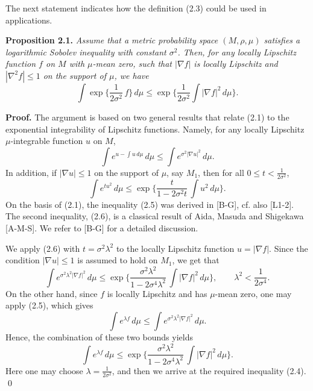 \documentclass[reqno,12pt]{amsart}
\theoremstyle{plain}
\begin{document}
The next statement indicates how the definition (2.3) could be used 
in applications.

\vskip5mm
{\bf Proposition 2.1.} {\it Assume that a metric probability space 
$(M,\rho,\mu)$ satisfies a logarithmic Sobolev inequality with constant 
$\sigma^2$. Then, for any locally Lipschitz function $f$ on $M$ with 
$\mu$-mean zero, such that $|\nabla f|$ is locally Lipschitz and
$|\nabla^2 f| \leq 1$ on the support of $\mu$, we have
\begin{equation}
\int \exp\Big\{\frac{1}{2\sigma^2}\, f\Big\}\,d\mu \leq \exp
\Big\{\frac{1}{2\sigma^2} \int |\nabla f|^2\,d\mu\Big\}.
\end{equation}
}

\vskip5mm
{\bf Proof.} The argument is based on two general results that relate 
(2.1) to the exponential integrability of Lipschitz functions.
Namely, for any locally Lipschitz $\mu$-integrable function $u$ on $M$,
\begin{equation}
\int e^{u - \int u\,d\mu}\,d\mu \leq \int e^{\sigma^2 |\nabla u|^2}\,d\mu.
\end{equation}
In addition, if $|\nabla u| \leq 1$ on the support of $\mu$, say $M_1$, 
then for all $0 \leq t < \frac{1}{2\sigma^2}$,
\begin{equation}
\int e^{tu^2}\,d\mu \leq \exp
\Big\{\frac{t}{1 - 2\sigma^2 t}\, \int u^2\,d\mu\Big\}.
\end{equation}
On the basis of (2.1), the inequality (2.5) was derived in [B-G], cf. also
[L1-2]. The second inequality, (2.6), is a classical result of Aida, Masuda 
and Shigekawa [A-M-S]. We refer to [B-G] for a detailed discussion. 

We apply (2.6) with $t = \sigma^2\lambda^2$ to the locally Lipschitz
function $u = |\nabla f|$. Since the condition $|\nabla u| \leq 1$
is assumed to hold on $M_1$, we get that
$$
\int e^{\sigma^2\lambda^2 |\nabla f|^2}\,d\mu \leq \exp
\bigg\{\frac{\sigma^2\lambda^2}{1 - 2\sigma^4\lambda^2}\, 
\int |\nabla f|^2\,d\mu\bigg\}, \qquad \lambda^2 < \frac{1}{2\sigma^4}.
$$
On the other hand, since $f$ is locally Lipschitz and has
$\mu$-mean zero, one may apply (2.5), which gives
$$
\int e^{\lambda f}\,d\mu \leq \int e^{\sigma^2 \lambda^2 |\nabla f|^2}\,d\mu.
$$
Hence, the combination of these two bounds yields
$$
\int e^{\lambda f}\,d\mu \leq \exp
\bigg\{\frac{\sigma^2\lambda^2}{1 - 2\sigma^4\lambda^2}\, 
\int |\nabla f|^2\,d\mu\bigg\}.
$$
Here one may choose $\lambda = \frac{1}{2\sigma^2}$, 
and then we arrive at the required inequality (2.4).
\qed
\end{document}
